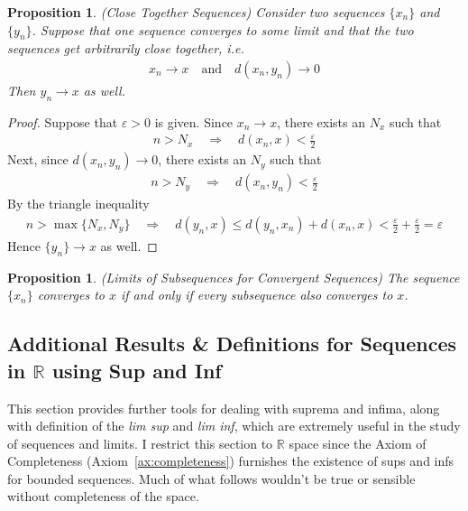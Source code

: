 \documentclass[12pt]{book}
\numberwithin{equation}{section} %
\theoremstyle{plain}
\newtheorem{prop}[thm]{Proposition}
\theoremstyle{definition}
\theoremstyle{remark}
\newcommand{\R}{\mathbb{R}}
\begin{document}
\begin{prop}{\emph{(Close Together Sequences)}}
Consider two sequences $\{x_n\}$ and $\{y_n\}$.
Suppose that one sequence converges to some limit and that the two
sequences get arbitrarily close together, i.e.
\begin{align*}
  x_n\rightarrow x
  \quad\text{and}\quad
  d(x_n,y_n)\rightarrow 0
\end{align*}
Then $y_n\rightarrow x$ as well.
\end{prop}
\begin{proof}
Suppose that $\varepsilon>0$ is given. Since $x_n\rightarrow x$, there
exists an $N_x$ such that
\begin{align*}
  n > N_x
  \quad\Rightarrow\quad
  d(x_n,x) < \frac{\varepsilon}{2}
\end{align*}
Next, since $d(x_n,y_n)\rightarrow 0$, there exists an $N_y$ such that
\begin{align*}
  n > N_y
  \quad\Rightarrow\quad
  d(x_n,y_n) < \frac{\varepsilon}{2}
\end{align*}
By the triangle inequality
\begin{align*}
  n>\max\{N_x,N_y\}
  \quad\Rightarrow\quad
  d(y_n,x) \leq
  d(y_n,x_n) + d(x_n,x)
  < \frac{\varepsilon}{2} + \frac{\varepsilon}{2} = \varepsilon
\end{align*}
Hence $\{y_n\}\rightarrow x$ as well.

\end{proof}

\begin{prop}{\emph{(Limits of Subsequences for Convergent Sequences)}}
\label{prop:subseq}
The sequence $\{x_n\}$ converges to $x$ if and only if every subsequence
also converges to $x$.
\end{prop}


\subsection{%
  Additional Results \& Definitions for Sequences in $\R$ using Sup and Inf
}

This section provides further tools for dealing with suprema and infima,
along with definition of the \emph{lim sup} and \emph{lim inf}, which
are extremely useful in the study of sequences and limits.
I restrict this section to $\R$ space since the Axiom of Completeness
(Axiom~\ref{ax:completeness}) furnishes the existence of sups and infs
for bounded sequences. Much of what follows wouldn't be true or sensible
without completeness of the space.
\end{document}
